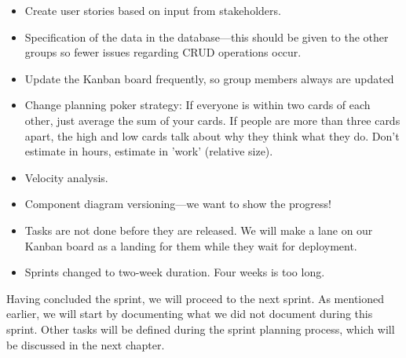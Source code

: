 \begin{itemize}
    \item Create user stories based on input from stakeholders.
    \item Specification of the data in the database---this should be given to the other groups so fewer issues regarding CRUD operations occur.
    \item Update the Kanban board frequently, so group members always are updated
    \item Change planning poker strategy:
    \subitem If everyone is within two cards of each other, just average the sum of your cards.
    \subitem If people are more than three cards apart, the high and low cards talk about why they think what they do.
    \subitem Don't estimate in hours, estimate in 'work' (relative size).
    \item Velocity analysis.
    \item Component diagram versioning---we want to show the progress!
    \item Tasks are not done before they are released. We will make a lane on our Kanban board as a landing for them while they wait for deployment.
    \item Sprints changed to two-week duration. Four weeks is too long.
\end{itemize}

Having concluded the sprint, we will proceed to the next sprint. As mentioned earlier, we will start by documenting what we did not document during this sprint. 
Other tasks will be defined during the sprint planning process, which will be discussed in the next chapter.